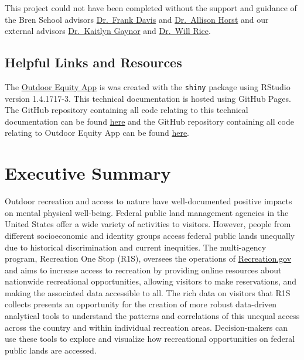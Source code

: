 \documentclass[
  11 pt,
  openany]{book}
\begin{document}
This project could not have been completed without the support and guidance of the Bren School advisors \href{https://bren.ucsb.edu/people/frank-davis}{Dr.~Frank Davis} and \href{https://bren.ucsb.edu/people/allison-horst}{Dr.~Allison Horst} and our external advisors \href{https://gaynorlab.weebly.com/people.html}{Dr.~Kaitlyn Gaynor} and \href{https://www.willrice.us/}{Dr.~Will Rice}.

\hypertarget{helpful-links-and-resources}{%
\section{Helpful Links and Resources}\label{helpful-links-and-resources}}

The \href{https://shinyapps.bren.ucsb.edu/oe_app/}{Outdoor Equity App} is was created with the \texttt{shiny} package \citep{R-shiny} using RStudio version 1.4.1717-3. This technical documentation is hosted using GitHub Pages. The GitHub repository containing all code relating to this technical documentation can be found \href{https://github.com/cboyajian/outdoor-equity-tech-doc}{here} and the GitHub repository containing all code relating to Outdoor Equity App can be found \href{https://github.com/outdoor-equity/outdoor-equity}{here}.

\hypertarget{executive-summary}{%
\chapter{Executive Summary}\label{executive-summary}}

Outdoor recreation and access to nature have well-documented positive impacts on mental physical well-being. Federal public land management agencies in the United States offer a wide variety of activities to visitors. However, people from different socioeconomic and identity groups access federal public lands unequally due to historical discrimination and current inequities. The multi-agency program, Recreation One Stop (R1S), oversees the operations of \href{https://www.recreation.gov/}{Recreation.gov} and aims to increase access to recreation by providing online resources about nationwide recreational opportunities, allowing visitors to make reservations, and making the associated data accessible to all. The rich data on visitors that R1S collects presents an opportunity for the creation of more robust data-driven analytical tools to understand the patterns and correlations of this unequal access across the country and within individual recreation areas. Decision-makers can use these tools to explore and visualize how recreational opportunities on federal public lands are accessed.
\end{document}
